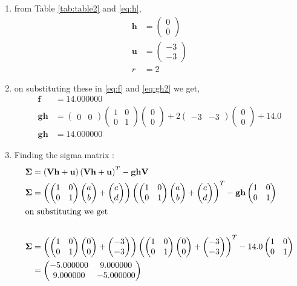 \documentclass[11pt, a4paper]{article}
\newcommand{\myvec}[1]{\ensuremath{\begin{pmatrix}#1\end{pmatrix}}}
\let\vec\mathbf
\providecommand{\brak}[1]{\ensuremath{\left(#1\right)}}
\begin{document}
\begin{enumerate}
\begin{enumerate}
\item from Table \ref{tab:table2} and \eqref{eq:h}, 
\begin{align}
\vec{h} &=\myvec{0 \\ 0} \\
\vec{u} &= \myvec{-3 \\ -3} \\
r &= 2 
\end{align}
\item on substituting these in \eqref{eq:f} and  \eqref{eq:gh2} we get,
\begin{align}
\vec{f} &=14.000000 \\
\vec{gh} &= \myvec{0 &0 }\myvec{1 & 0 \\ 0 & 1}\myvec{0 \\ 0} + 2\myvec{-3& -3}\myvec{0 \\0 } + 14.0 \\
\vec{gh} &= 14.000000  
\end{align}

\item Finding the sigma matrix : 
\begin{align}
	\vec{\Sigma} &= \brak{\vec{V}\vec{h}+\vec{u}}\brak{\vec{V}\vec{h}+\vec{u}}^T -\vec{gh}\vec{V}  \label{eq:sigmat}\\
	\vec{\Sigma} &= \brak{\myvec{1 &0 \\0 & 1}\myvec{a \\ b}+\myvec{c \\ d}} \brak{\myvec{1 &0 \\0 & 1}\myvec{a \\b}+\myvec{c \\ d}}^T - \vec{gh}\myvec{1 &0 \\ 0& 1}   \label{eq:sigmat2} \\
\intertext{on substituting we get  }   \nonumber \\ 
	\vec{\Sigma} &= \brak{\myvec{1 &0 \\ 0 &1}\myvec{0 \\ 0 }+\myvec{-3 \\  -3}} \brak{\myvec{1 &0 \\ 0&1}\myvec{0 \\ 0}+\myvec{-3 \\ -3}}^T - 14.0 \myvec{1 &0 \\ 0& 1 } \\
	&= \myvec{-5.000000  & 9.000000 \\ 9.000000 & -5.000000 } \label{eq:sigmat3}
\end{align}


\end{enumerate}
\end{enumerate}
\end{document}
